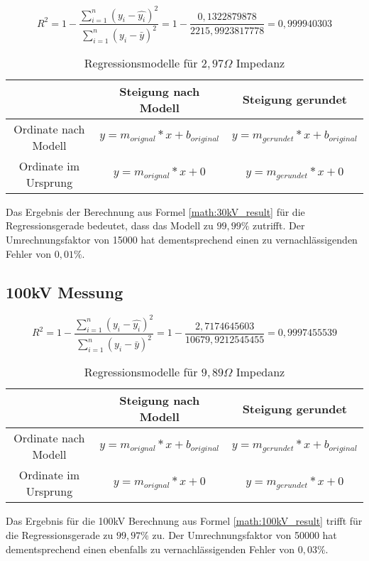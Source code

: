 \begin{equation}
R^{2} = 1 - \frac{\sum \limits_{i=1}^n (y_i - \hat{y_i})^{2}}{\sum \limits_{i=1}^n (y_i - \bar{y})^{2}} = 1 - \frac{0,1322879878}{2215,9923817778} = 0,999940303
\label{math:30kV_result}
\end{equation}

\begin{table}[H]
  \caption{ Regressionsmodelle für $2,97 \Omega$ Impedanz}
  \begingroup
 
\renewcommand{\arraystretch}{1.5} %
   \begin{tabular}{|c|c|c|}
   \hline
      & Steigung nach Modell & Steigung gerundet     \\
      \hline
    Ordinate nach Modell      & $y=m_{orignal}*x+b_{original}$      & $y=m_{gerundet}*x+b_{original}$ \\
     \hline
    Ordinate im Ursprung      & $y=m_{orignal}*x+0$      & $y=m_{gerundet}*x+0$ \\
 \hline
  \end{tabular}
  \endgroup
\end{table}

Das Ergebnis der Berechnung aus Formel \ref{math:30kV_result} für die Regressionsgerade bedeutet, dass das Modell zu $99,99\%$ zutrifft. Der Umrechnungsfaktor von 15000 hat dementsprechend einen zu vernachlässigenden Fehler von $0,01\%$.

\subsection{100kV Messung}

\begin{equation}
R^{2} = 1 - \frac{\sum \limits_{i=1}^n (y_i - \hat{y_i})^{2}}{\sum \limits_{i=1}^n (y_i - \bar{y})^{2}} = 1 - \frac{2,7174645603}{10679,9212545455} = 0,9997455539
\label{math:100kV_result}
\end{equation}


\begin{table}[H]
  \caption{ Regressionsmodelle für $9,89 \Omega$ Impedanz}
  \begingroup
\renewcommand{\arraystretch}{1.5} %
   \begin{tabular}{|c|c|c|}
   \hline
      & Steigung nach Modell & Steigung gerundet     \\
      \hline
    Ordinate nach Modell      & $y=m_{orignal}*x+b_{original} $   & $ y=m_{gerundet}*x+b_{original}$ \\
     \hline
    Ordinate im Ursprung      & $y=m_{orignal}*x+0 $     &$ y=m_{gerundet}*x+0$ \\
 \hline
  \end{tabular}
  \endgroup
\end{table}

Das Ergebnis für die 100kV Berechnung aus Formel \ref{math:100kV_result} trifft für die Regressionsgerade zu $99,97\%$ zu. Der Umrechnungsfaktor von 50000 hat dementsprechend einen ebenfalls zu vernachlässigenden Fehler von $0,03\%$.

